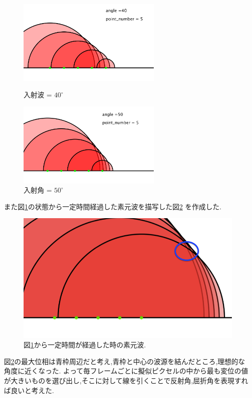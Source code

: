 \begin{figure}[H]
\begin{minipage}{0.5\hsize}
\begin{center}
\includegraphics[width=70mm]
  {../considaration/angle40.png}
\caption{入射波 = $40^{\circ}$}
\label{fig:angle40}
\end{center}
\end{minipage}%
\begin{minipage}{0.5\hsize}
\begin{center}
\includegraphics[width=70mm]
  {../considaration/angle50.png}
\caption{入射角 = $50^{\circ}$}
\label{fig:angle50}
\end{center}
\end{minipage}
\end{figure}
また図\ref{fig:angle50}の状態から一定時間経過した素元波を描写した図\ref{fig:angle50time}
を作成した.
\begin{figure}[H]
 \begin{center}
  \includegraphics[width=130mm]{../considaration/angle50time.png}
 \end{center}
 \caption{図\ref{fig:angle50}から一定時間が経過した時の素元波.}
 \label{fig:angle50time}
\end{figure}
図\ref{fig:angle50time}の最大位相は青枠周辺だと考え,青枠と中心の波源を結んだところ,理想的な角度に近くなった.
よって毎フレームごとに擬似ピクセルの中から最も変位の値が大きいものを選び出し,そこに対して線を引くことで反射角,屈折角を表現すれば良いと考えた.
